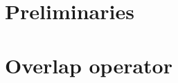 \documentclass[a4paper,UKenglish]{lipics-v2021}
\begin{document}
	
	\maketitle
	
	
	
%	
%	
	
	\section{Preliminaries}\label{sec:preliminaries}
	
	
	
	\section{Overlap operator}\label{sec:results}
	
	
	
%	
%	
	
	
	
	
%	
%	
%	
%	
%	
%	
	
\end{document}

